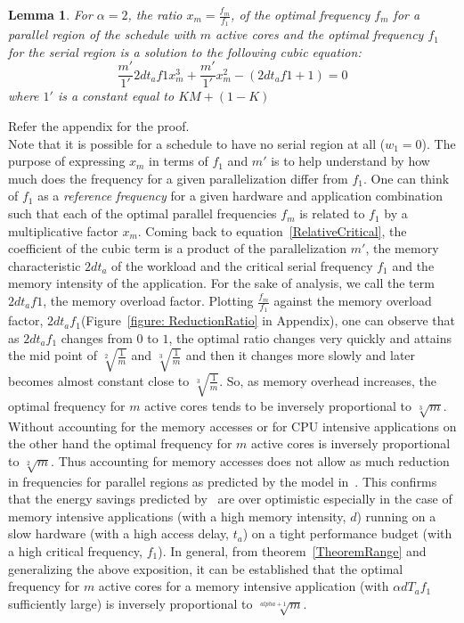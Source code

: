 \documentclass[11pt, letterpaper]{article}
\newtheorem{lemma}{Lemma}
\begin{document}
\begin{lemma}\label{CubicEquation}
 For $\alpha=2$, the ratio $x_m= \frac{f_m}{f_1}$, of the optimal frequency $f_m$ for a parallel region of the schedule with $m$ active cores and the optimal frequency $f_1$ for the serial region is a solution to the following cubic equation:
 \begin{displaymath}
   \frac{m'}{1'}2dt_af1x_m^3 + \frac{m'}{1'}x_m^2 -(2dt_af1 + 1) = 0
 \end{displaymath}
 where $1'$ is a constant equal to $KM + (1-K)$
\end{lemma}
Refer the appendix for the proof.\\
Note that it is possible for a schedule to have no serial region at all ($w_1 =0$). The purpose of expressing $x_m$ in terms of $f_1$ and $m'$ is to help understand by how much does the frequency for a given parallelization differ from $f_1$. One can think of $f_1$ as a \emph{reference frequency} for a given hardware and application combination such that each of the optimal parallel frequencies $f_m$ is related to $f_1$ by a multiplicative factor $x_m$.
Coming back to equation~\ref{RelativeCritical}, the coefficient of the cubic term is a product of the parallelization $m'$, the memory characteristic $2dt_a$ of the workload and the critical serial frequency $f_1$ and the memory intensity of the application. For the sake of analysis, we call the term $2dt_af1$, the memory overload factor. 
Plotting $\frac{f_m}{f_1}$ against the memory overload factor, $2dt_af_1$(Figure~\ref{figure: ReductionRatio} in Appendix), one can observe that as $2dt_af_1$  changes from $0$ to $1$, the optimal ratio changes very quickly and attains the mid point of $\sqrt[2]{\frac{1}{m}}$ and $\sqrt[3]{\frac{1}{m}}$ and then it changes more slowly and later becomes almost constant close to $\sqrt[3]{\frac{1}{m}}$. So, as memory overhead increases, the optimal frequency for $m$ active cores tends to be inversely proportional to $\sqrt[3]{m}$. Without accounting for the memory accesses or for CPU intensive applications on the other hand the optimal frequency for $m$ active cores is inversely proportional to $\sqrt[2]{m}$. Thus accounting for memory accesses does not allow as much reduction in frequencies for parallel regions as predicted by the model in~\cite{ConvexAndScheduling}. 
This confirms that the energy savings predicted by~\cite{ConvexAndScheduling} are over optimistic especially in the case of memory intensive applications (with a high memory intensity, $d$) running on a slow hardware (with a high access 
delay, $t_a$) on a tight performance budget (with a high critical frequency, $f_1$).
In general, from theorem~\ref{TheoremRange} and generalizing the above exposition, it can be established that the optimal frequency for $m$ active cores for a memory intensive application (with $\alpha dT_af_1$ sufficiently large) is inversely proportional to $\sqrt[alpha+1]{m}$.
\end{document}
